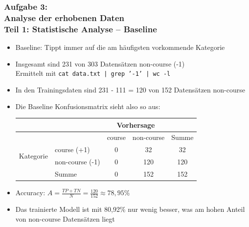 \documentclass[accentcolor=tud7b,noresetcounter]{tudbeamer}
\begin{document}
	\begin{frame}
		\frametitle{Aufgabe 3:\\ Analyse der erhobenen Daten\\ Teil 1: Statistische Analyse -- Baseline}
		\begin{itemize}
			\item Baseline: Tippt immer auf die am häufigsten vorkommende Kategorie
			\item Insgesamt sind 231 von 303 Datensätzen non-course (-1) \\
			      Ermittelt mit \texttt{cat data.txt | grep '-1' | wc -l}
			\item In den Trainingsdaten sind 231 - 111 = 120 von 152 Datensätzen non-course
			\item Die Baseline Konfusionsmatrix sieht also so aus: \\
			\begin{tabular}{|l|l|c|c||c|}
		\hline
			& & \multicolumn{2}{c|}{Vorhersage} & \\
			\hline
			& & course & non-course & Summe \\
			\hline
		\multirow{2}{*}{Kategorie} & course (+1) & 0 & 32 & 32 \\
		\cline{2-5}
		& non-course (-1) & 0  & 120 & 120\\
		\hline
		& Summe & 0 & 152 & 152 \\
		\hline
		\end{tabular}
			\item Accuracy: $A = \frac{TP + TN}{N} = \frac{120}{152} \approx 78,95\%$
			\item Das trainierte Modell ist mit 80,92\% nur wenig besser, was am hohen Anteil von non-course Datensätzen liegt
		\end{itemize}

		

	\end{frame}



\end{document}
